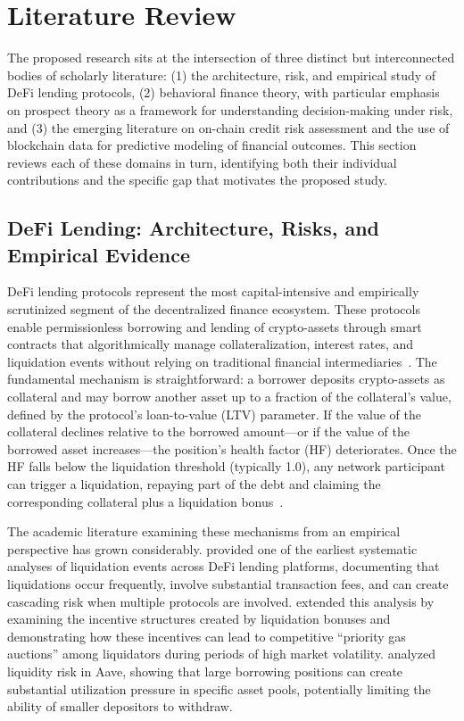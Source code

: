 \section{Literature Review}

The proposed research sits at the intersection of three distinct but interconnected bodies of scholarly literature: (1) the architecture, risk, and empirical study of DeFi lending protocols, (2) behavioral finance theory, with particular emphasis on prospect theory as a framework for understanding decision-making under risk, and (3) the emerging literature on on-chain credit risk assessment and the use of blockchain data for predictive modeling of financial outcomes. This section reviews each of these domains in turn, identifying both their individual contributions and the specific gap that motivates the proposed study.

\subsection{DeFi Lending: Architecture, Risks, and Empirical Evidence}

DeFi lending protocols represent the most capital-intensive and empirically scrutinized segment of the decentralized finance ecosystem. These protocols enable permissionless borrowing and lending of crypto-assets through smart contracts that algorithmically manage collateralization, interest rates, and liquidation events without relying on traditional financial intermediaries~\cite{schar2021decentralized2}. The fundamental mechanism is straightforward: a borrower deposits crypto-assets as collateral and may borrow another asset up to a fraction of the collateral's value, defined by the protocol's loan-to-value (LTV) parameter. If the value of the collateral declines relative to the borrowed amount—or if the value of the borrowed asset increases—the position's health factor (HF) deteriorates. Once the HF falls below the liquidation threshold (typically 1.0), any network participant can trigger a liquidation, repaying part of the debt and claiming the corresponding collateral plus a liquidation bonus~\cite{perez2020liquidations, qin2021empirical}.

The academic literature examining these mechanisms from an empirical perspective has grown considerably. \citet{perez2020liquidations} provided one of the earliest systematic analyses of liquidation events across DeFi lending platforms, documenting that liquidations occur frequently, involve substantial transaction fees, and can create cascading risk when multiple protocols are involved. \citet{qin2021empirical} extended this analysis by examining the incentive structures created by liquidation bonuses and demonstrating how these incentives can lead to competitive ``priority gas auctions'' among liquidators during periods of high market volatility. \citet{sun2022liquidity} analyzed liquidity risk in Aave, showing that large borrowing positions can create substantial utilization pressure in specific asset pools, potentially limiting the ability of smaller depositors to withdraw.

